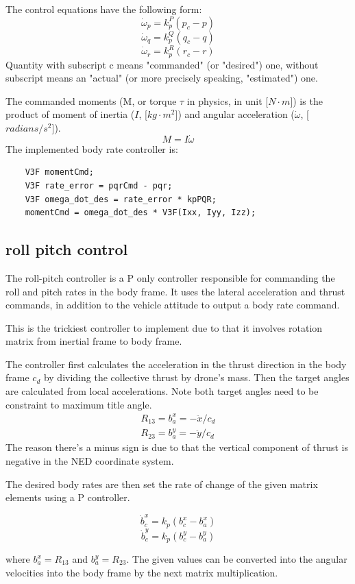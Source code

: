 \documentclass[a4paper]{article}
\begin{document}
The control equations have the following form:
$$ \dot{\omega}_{p} = k_{p}^{P} (p_c - p) $$
$$ \dot{\omega}_{q} = k_{p}^{Q} (q_c - q) $$
$$ \dot{\omega}_{r} = k_{p}^{R} (r_c - r) $$
Quantity with subscript c means "commanded" (or "desired") one, without subscript means an "actual" (or more precisely speaking, "estimated") one.

The commanded moments (M, or torque $\tau$ in physics, in unit [$N \cdot m$]) is the product of moment of inertia ($I$, [$kg \cdot m^2$]) and angular acceleration ($\dot{\omega}$, [$radians/s^2$]).
$$ M = I \dot{\omega} $$
The implemented body rate controller is:

\begin{lstlisting}
    V3F momentCmd;
    V3F rate_error = pqrCmd - pqr;
    V3F omega_dot_des = rate_error * kpPQR;
    momentCmd = omega_dot_des * V3F(Ixx, Iyy, Izz);
\end{lstlisting}

\subsection{roll pitch control}
The roll-pitch controller is a P only controller responsible for commanding the roll and pitch rates in the body frame. It uses the lateral acceleration and thrust commands, in addition to the vehicle attitude to output a body rate command. 

This is the trickiest controller to implement due to that it involves rotation matrix from inertial frame to body frame.

The controller first calculates the acceleration in the thrust direction in the body frame $c_d$ by dividing the collective thrust by drone's mass. Then the target angles are calculated from local accelerations. Note both target angles need to be constraint to maximum title angle.
\begin{gather*}
R_{13} = b^x_a = - \ddot{x} / c_d \\
R_{23} = b^y_a = - \ddot{y} / c_d
\end{gather*}
The reason there's a minus sign is due to that the vertical component of thrust is negative in the NED coordinate system.

The desired body rates are then set the rate of change of the given matrix elements using a P controller. 

$$\dot{b}^x_c  = k_p(b^x_c - b^x_a)$$
$$\dot{b}^y_c  = k_p(b^y_c - b^y_a)$$

where $b^x_a = R_{13}$ and $b^y_a = R_{23}$. The given values can be converted into the angular velocities into the body frame by the next matrix multiplication. 
\end{document}
